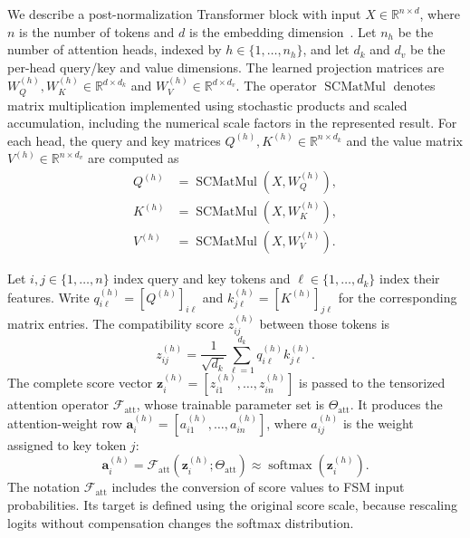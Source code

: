 \documentclass[pdflatex,sn-mathphys-num]{sn-jnl}
\theoremstyle{thmstyleone}
\theoremstyle{thmstyletwo}
\theoremstyle{thmstylethree}
\begin{document}
We describe a post-normalization Transformer block with input $X\in\mathbb{R}^{n\times d}$, where $n$ is the number of tokens and $d$ is the embedding dimension~\cite{vaswani2017attention}. Let $n_h$ be the number of attention heads, indexed by $h\in\{1,\ldots,n_h\}$, and let $d_k$ and $d_v$ be the per-head query/key and value dimensions. The learned projection matrices are $W_Q^{(h)},W_K^{(h)}\in\mathbb{R}^{d\times d_k}$ and $W_V^{(h)}\in\mathbb{R}^{d\times d_v}$. The operator $\operatorname{SCMatMul}$ denotes matrix multiplication implemented using stochastic products and scaled accumulation, including the numerical scale factors in the represented result. For each head, the query and key matrices $Q^{(h)},K^{(h)}\in\mathbb{R}^{n\times d_k}$ and the value matrix $V^{(h)}\in\mathbb{R}^{n\times d_v}$ are computed as
\begin{equation}
\begin{aligned} Q^{(h)} &= \operatorname{SCMatMul}(X,W_Q^{(h)}), \\ K^{(h)} &= \operatorname{SCMatMul}(X,W_K^{(h)}), \\ V^{(h)} &= \operatorname{SCMatMul}(X,W_V^{(h)}). \end{aligned} \label{eq:stochastic_qkv}
\end{equation}

Let $i,j\in\{1,\ldots,n\}$ index query and key tokens and $\ell\in\{1,\ldots,d_k\}$ index their features. Write $q_{i\ell}^{(h)}=[Q^{(h)}]_{i\ell}$ and $k_{j\ell}^{(h)}=[K^{(h)}]_{j\ell}$ for the corresponding matrix entries. The compatibility score $z_{ij}^{(h)}$ between those tokens is
\begin{equation}
z_{ij}^{(h)} = \frac{1}{\sqrt{d_k}} \sum_{\ell=1}^{d_k} q_{i\ell}^{(h)}k_{j\ell}^{(h)}. \label{eq:stochastic_attention_score}
\end{equation}
The complete score vector $\boldsymbol{z}_i^{(h)}=[z_{i1}^{(h)},\ldots,z_{in}^{(h)}]$ is passed to the tensorized attention operator $\mathcal{F}_{\mathrm{att}}$, whose trainable parameter set is $\Theta_{\mathrm{att}}$. It produces the attention-weight row $\boldsymbol{a}_i^{(h)}=[a_{i1}^{(h)},\ldots,a_{in}^{(h)}]$, where $a_{ij}^{(h)}$ is the weight assigned to key token $j$:
\begin{equation}
\boldsymbol{a}_i^{(h)} = \mathcal{F}_{\mathrm{att}} \left( \boldsymbol{z}_i^{(h)}; \Theta_{\mathrm{att}} \right) \approx \operatorname{softmax} \left( \boldsymbol{z}_i^{(h)} \right). \label{eq:frost_attention_operator}
\end{equation}
The notation $\mathcal{F}_{\mathrm{att}}$ includes the conversion of score values to FSM input probabilities. Its target is defined using the original score scale, because rescaling logits without compensation changes the softmax distribution.
\end{document}

